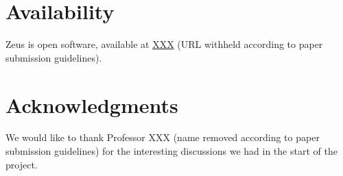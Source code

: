\documentclass[letterpaper,10pt]{article}
\begin{document}
\section{Availability}

Zeus is open software, available at \url{XXX} (URL withheld according
to paper submission guidelines).

\section{Acknowledgments}

We would like to thank Professor XXX (name removed according to paper
submission guidelines) for the interesting discussions we had in the
start of the project.

{\footnotesize


}
\end{document}
